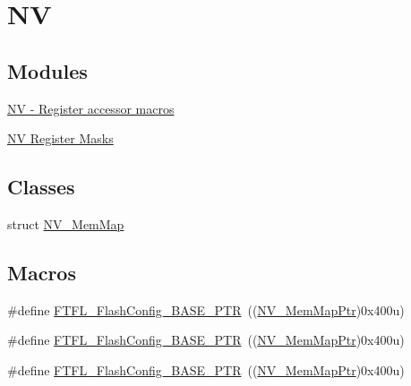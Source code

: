 \hypertarget{group___n_v___peripheral}{}\section{NV}
\label{group___n_v___peripheral}
\subsection*{Modules}
\begin{DoxyCompactItemize}
\item 
\hyperlink{group___n_v___register___accessor___macros}{N\+V -\/ Register accessor macros}
\item 
\hyperlink{group___n_v___register___masks}{N\+V Register Masks}
\end{DoxyCompactItemize}
\subsection*{Classes}
\begin{DoxyCompactItemize}
\item 
struct \hyperlink{struct_n_v___mem_map}{N\+V\+\_\+\+Mem\+Map}
\end{DoxyCompactItemize}
\subsection*{Macros}
\begin{DoxyCompactItemize}
\item 
\#define \hyperlink{group___n_v___peripheral_gad199a235b90fe3e6afb977f2d6a9c565}{F\+T\+F\+L\+\_\+\+Flash\+Config\+\_\+\+B\+A\+S\+E\+\_\+\+P\+TR}~((\hyperlink{group___n_v___peripheral_ga9aac431b01e6b976f2f4e32409ab725f}{N\+V\+\_\+\+Mem\+Map\+Ptr})0x400u)
\item 
\#define \hyperlink{group___n_v___peripheral_gad199a235b90fe3e6afb977f2d6a9c565}{F\+T\+F\+L\+\_\+\+Flash\+Config\+\_\+\+B\+A\+S\+E\+\_\+\+P\+TR}~((\hyperlink{group___n_v___peripheral_ga9aac431b01e6b976f2f4e32409ab725f}{N\+V\+\_\+\+Mem\+Map\+Ptr})0x400u)
\item 
\#define \hyperlink{group___n_v___peripheral_gad199a235b90fe3e6afb977f2d6a9c565}{F\+T\+F\+L\+\_\+\+Flash\+Config\+\_\+\+B\+A\+S\+E\+\_\+\+P\+TR}~((\hyperlink{group___n_v___peripheral_ga9aac431b01e6b976f2f4e32409ab725f}{N\+V\+\_\+\+Mem\+Map\+Ptr})0x400u)
\end{DoxyCompactItemize}
